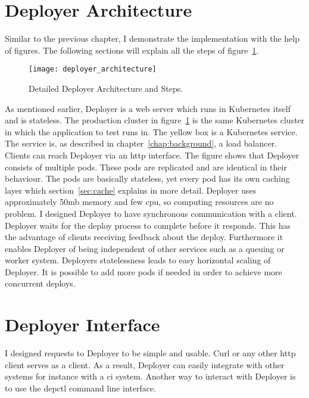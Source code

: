 \section{Deployer Architecture}

Similar to the previous chapter, I demonstrate the implementation with the help of
figures. The following sections will explain all the steps of
figure~\ref{fig:deployer_architecture}.

\begin{figure}[htbp]
  \centering
  \texttt{[image: deployer\_architecture]}
  \caption[nprtflow]{Detailed Deployer Architecture and Steps.}
  \label{fig:deployer_architecture}
\end{figure}

As mentioned earlier, Deployer is a web server which runs in Kubernetes itself and is
stateless. The production cluster in figure~\ref{fig:deployer_architecture} is the same
Kubernetes cluster in which the application to test runs in. The yellow box is a
Kubernetes service. The service is, as described in chapter~\ref{chap:background}, a
load balancer. Clients can reach Deployer via an http interface. The figure shows that
Deployer consists of multiple pods. These pods are replicated and are identical in their
behaviour. The pods are basically stateless, yet every pod has its own caching layer which
section~\ref{sec:cache} explains in more detail. Deployer uses approximately 50mb memory
and few cpu, so computing resources are no problem. I designed Deployer to have
synchronous communication with a client. Deployer waits for the deploy process to complete
before it responds. This has the advantage of clients receiving feedback about the
deploy. Furthermore it enables Deployer of being independent of other services such as a
queuing or worker system. Deployers statelessness leads to easy horizontal scaling of
Deployer. It is possible to add more pods if needed in order to achieve more concurrent
deploys.

\section{Deployer Interface}
\label{sec:interface}

I designed requests to Deployer to be simple and usable. Curl or any other http client
serves as a client. As a result, Deployer can easily integrate with other systems for
instance with a \gls{ci} system. Another way to interact with Deployer is to use the
depctl command line interface.

